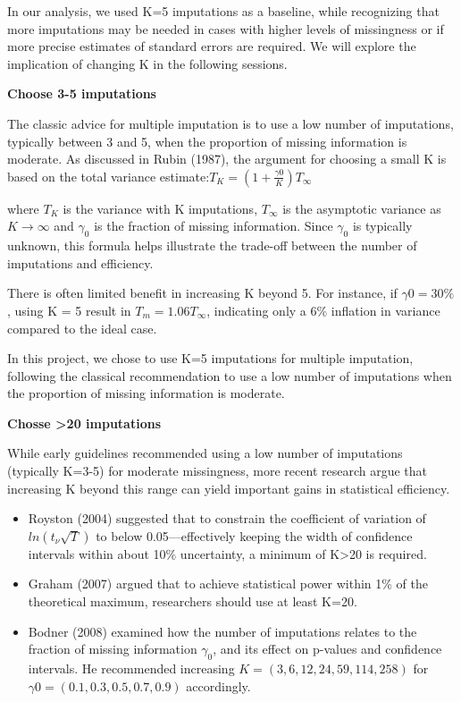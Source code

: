 \documentclass{article}
\providecommand{\tightlist}{%
  \setlength{\itemsep}{0pt}\setlength{\parskip}{0pt}}
\begin{document}
In our analysis, we used K=5 imputations as a baseline, while
recognizing that more imputations may be needed in cases with higher
levels of missingness or if more precise estimates of standard errors
are required. We will explore the implication of changing K in the
following sessions.

\textbf{Choose 3-5 imputations}

The classic advice for multiple imputation is to use a low number of
imputations, typically between 3 and 5, when the proportion of missing
information is moderate. As discussed in Rubin (1987), the argument for
choosing a small K is based on the total variance
estimate:\(T_{K} = (1 + \frac{\gamma0}{K}) T_{\infty}\)

where \(T_{K}\) is the variance with K imputations, \(T_{\infty}\) is
the asymptotic variance as \(K \rightarrow \infty\) and \(\gamma_{0}\)
is the fraction of missing information. Since \(\gamma_{0}\) is
typically unknown, this formula helps illustrate the trade-off between
the number of imputations and efficiency.

There is often limited benefit in increasing K beyond 5. For instance,
if \(\gamma0=30\%\), using K = 5 result in \(T_m=1.06T_\infty\),
indicating only a 6\% inflation in variance compared to the ideal case.

In this project, we chose to use K=5 imputations for multiple
imputation, following the classical recommendation to use a low number
of imputations when the proportion of missing information is moderate.

\textbf{Chosse \textgreater20 imputations}

While early guidelines recommended using a low number of imputations
(typically K=3-5) for moderate missingness, more recent research argue
that increasing K beyond this range can yield important gains in
statistical efficiency.

\begin{itemize}
\tightlist
\item
  Royston (2004) suggested that to constrain the coefficient of
  variation of \(ln(t_{\nu}\sqrt{T})\) to below 0.05---effectively
  keeping the width of confidence intervals within about 10\%
  uncertainty, a minimum of K\textgreater20 is required.
\item
  Graham (2007) argued that to achieve statistical power within 1\% of
  the theoretical maximum, researchers should use at least K=20.
\item
  Bodner (2008) examined how the number of imputations relates to the
  fraction of missing information \(\gamma_{0}\), and its effect on
  p-values and confidence intervals. He recommended increasing
  \(K=(3,6,12,24,59,114,258)\) for \(\gamma0=(0.1, 0.3, 0.5, 0.7, 0.9)\)
  accordingly.
\end{itemize}
\end{document}
